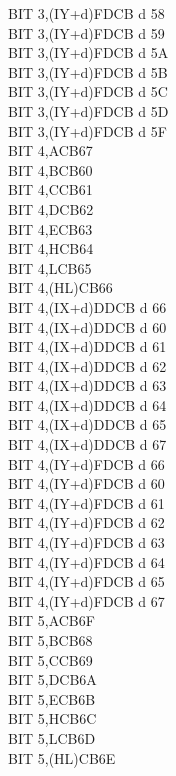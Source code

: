 \begin{multicols}{3}
{\begin{tabbing}
		BIT 3,(IY+d)\UNDOC\>FDCB d 58\\
		BIT 3,(IY+d)\UNDOC\>FDCB d 59\\
		BIT 3,(IY+d)\UNDOC\>FDCB d 5A\\
		BIT 3,(IY+d)\UNDOC\>FDCB d 5B\\
		BIT 3,(IY+d)\UNDOC\>FDCB d 5C\\
		BIT 3,(IY+d)\UNDOC\>FDCB d 5D\\
		BIT 3,(IY+d)\UNDOC\>FDCB d 5F\\
		BIT 4,A\>CB67\\
		BIT 4,B\>CB60\\
		BIT 4,C\>CB61\\
		BIT 4,D\>CB62\\
		BIT 4,E\>CB63\\
		BIT 4,H\>CB64\\
		BIT 4,L\>CB65\\
		BIT 4,(HL)\>CB66\\
		BIT 4,(IX+d)\>DDCB d 66\\
		BIT 4,(IX+d)\UNDOC\>DDCB d 60\\
		BIT 4,(IX+d)\UNDOC\>DDCB d 61\\
		BIT 4,(IX+d)\UNDOC\>DDCB d 62\\
		BIT 4,(IX+d)\UNDOC\>DDCB d 63\\
		BIT 4,(IX+d)\UNDOC\>DDCB d 64\\
		BIT 4,(IX+d)\UNDOC\>DDCB d 65\\
		BIT 4,(IX+d)\UNDOC\>DDCB d 67\\
		BIT 4,(IY+d)\>FDCB d 66\\
		BIT 4,(IY+d)\UNDOC\>FDCB d 60\\
		BIT 4,(IY+d)\UNDOC\>FDCB d 61\\
		BIT 4,(IY+d)\UNDOC\>FDCB d 62\\
		BIT 4,(IY+d)\UNDOC\>FDCB d 63\\
		BIT 4,(IY+d)\UNDOC\>FDCB d 64\\
		BIT 4,(IY+d)\UNDOC\>FDCB d 65\\
		BIT 4,(IY+d)\UNDOC\>FDCB d 67\\
		BIT 5,A\>CB6F\\
		BIT 5,B\>CB68\\
		BIT 5,C\>CB69\\
		BIT 5,D\>CB6A\\
		BIT 5,E\>CB6B\\
		BIT 5,H\>CB6C\\
		BIT 5,L\>CB6D\\
		BIT 5,(HL)\>CB6E\\

\end{tabbing}}
\end{multicols}
